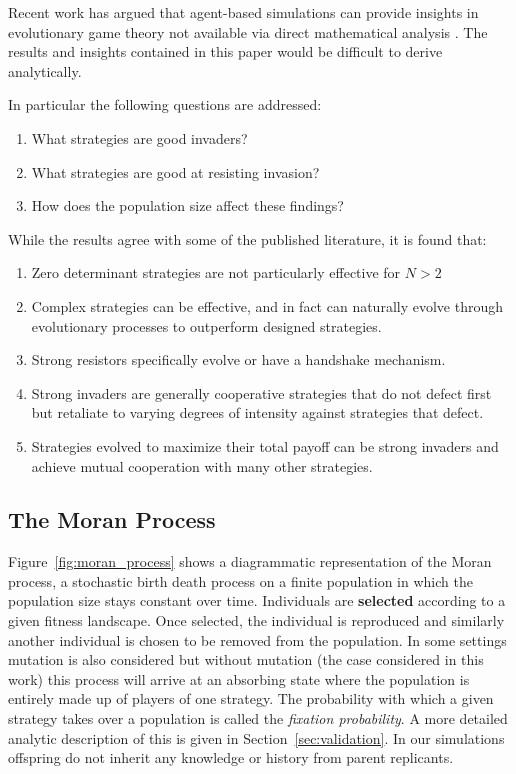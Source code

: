 \documentclass{article}
\begin{document}
Recent work has argued that agent-based
simulations can provide insights in evolutionary game theory not available
via direct mathematical analysis \cite{adami2016evolutionary}. The results
and insights contained in this paper would be difficult to derive analytically.

In particular the following questions are addressed:
\begin{enumerate}
    \item What strategies are good invaders?
    \item What strategies are good at resisting invasion?
    \item How does the population size affect these findings?
\end{enumerate}

While the results agree with some of the published literature, it is found that:

\begin{enumerate}
 \item Zero determinant strategies are not particularly effective for $N > 2$
 \item Complex strategies can be effective, and in fact can naturally evolve
     through evolutionary processes to outperform designed strategies.
 \item Strong resistors specifically evolve or have a handshake mechanism.
 \item Strong invaders are generally cooperative strategies that do not defect
 first but retaliate to varying degrees of intensity against strategies that defect.
 \item Strategies evolved to maximize their total payoff can be strong invaders
 and achieve mutual cooperation with many other strategies.
\end{enumerate}

\subsection{The Moran Process}\label{sec:the_moran_process}

Figure~\ref{fig:moran_process} shows a diagrammatic representation of the Moran
process, a stochastic birth death process on a finite population in which the
population size stays constant over time. Individuals are \textbf{selected}
according to a given fitness landscape. Once selected, the individual is
reproduced and similarly another individual is chosen to be removed from the
population. In some settings mutation is also considered but without mutation
(the case considered in this work) this process will arrive at an absorbing
state where the population is entirely made up of players of one strategy. The
probability with which a given strategy takes over a population is called the
\textit{fixation probability}. A more detailed analytic description of this is
given in Section~\ref{sec:validation}. In our simulations offspring do not
inherit any knowledge or history from parent replicants.
\end{document}
